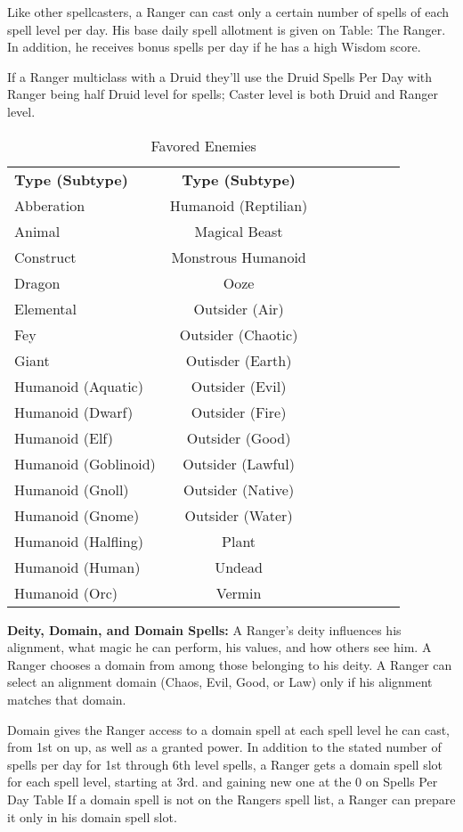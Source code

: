 Like other spellcasters, a Ranger can cast only a certain number of spells of each spell level per day. His base daily spell allotment is given on Table: The Ranger. In addition, he receives bonus spells per day if he has a high Wisdom score.

If a Ranger multiclass with a Druid they'll use the Druid Spells Per Day with Ranger being half Druid level for spells; Caster level is both Druid and Ranger level. 

\begin{wraptable}{O}{8.75cm}
\caption{\currentclassname{} Favored Enemies}
\begin{tabular}{l*{7}{c}}
\textbf{Type (Subtype)} & \textbf{Type (Subtype)}\\
Abberation & Humanoid (Reptilian)\\
Animal & Magical Beast\\
Construct & Monstrous Humanoid\\
Dragon & Ooze\\
Elemental & Outsider (Air)\\
Fey & Outsider (Chaotic)\\
Giant & Outisder (Earth)\\
Humanoid (Aquatic) & Outsider (Evil)\\
Humanoid (Dwarf) & Outsider (Fire)\\
Humanoid (Elf) & Outsider (Good)\\
Humanoid (Goblinoid) & Outsider (Lawful)\\
Humanoid (Gnoll) & Outsider (Native)\\
Humanoid (Gnome) & Outsider (Water)\\
Humanoid (Halfling) & Plant\\
Humanoid (Human) & Undead\\
Humanoid (Orc) & Vermin\\
\end{tabular}
\end{wraptable}

\textbf{Deity, Domain, and Domain Spells:} A Ranger's deity influences his alignment, what magic he can perform, his values, and how others see him. A Ranger chooses a domain from among those belonging to his deity. A Ranger can select an alignment domain (Chaos, Evil, Good, or Law) only if his alignment matches that domain.

Domain gives the Ranger access to a domain spell at each spell level he can cast, from 1st on up, as well as a granted power. In addition to the stated number of spells per day for 1st through 6th level spells, a Ranger gets a domain spell slot for each spell level, starting at 3rd. and gaining  new one at the 0 on Spells Per Day Table If a domain spell is not on the Rangers spell list, a Ranger can prepare it only in his domain spell slot.


